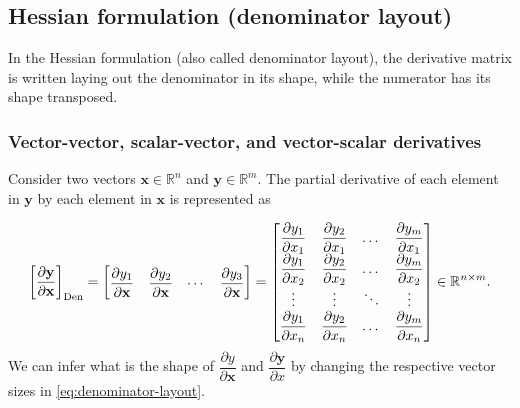 \subsection{Hessian formulation (denominator layout)}
\label{sec:denominator}

In the Hessian formulation (also called denominator layout), the derivative matrix is written laying out the denominator in its shape, while the numerator has its shape transposed.

\subsubsection{Vector-vector, scalar-vector, and vector-scalar derivatives}
Consider two vectors \(\mathbf{x} \in \mathbb{R}^n\) and \(\mathbf{y} \in \mathbb{R}^m\). The partial derivative of each element in \(\mathbf{y}\) by each element in \(\mathbf{x}\) is represented as

\begin{align}
    \label{eq:denominator-layout}
    \left[ \dfrac{\partial \mathbf{y}}{\partial \mathbf{x}} \right]_{\textnormal{Den}} = \begin{bmatrix}
        \dfrac{\partial y_1}{\partial \mathbf{x}} & \dfrac{\partial y_2}{\partial \mathbf{x}} & \cdots & \dfrac{\partial y_3}{\partial \mathbf{x}}
    \end{bmatrix} = \begin{bmatrix}
        \dfrac{\partial y_1}{\partial x_1} & \dfrac{\partial y_2}{\partial x_1} & \dots & \dfrac{\partial y_m}{\partial x_1} \\
        \dfrac{\partial y_1}{\partial x_2} & \dfrac{\partial y_2}{\partial x_2} & \dots & \dfrac{\partial y_m}{\partial x_2} \\
        \vdots & \vdots & \ddots & \vdots \\
        \dfrac{\partial y_1}{\partial x_n} & \dfrac{\partial y_2}{\partial x_n} & \dots & \dfrac{\partial y_m}{\partial x_n} \\
    \end{bmatrix} \in \mathbb{R}^{n\times m}.
\end{align}
We can infer what is the shape of \(\dfrac{\partial y}{\partial \mathbf{x}}\) and \(\dfrac{\partial \mathbf{y}}{\partial x}\) by changing the respective vector sizes in \eqref{eq:denominator-layout}.

